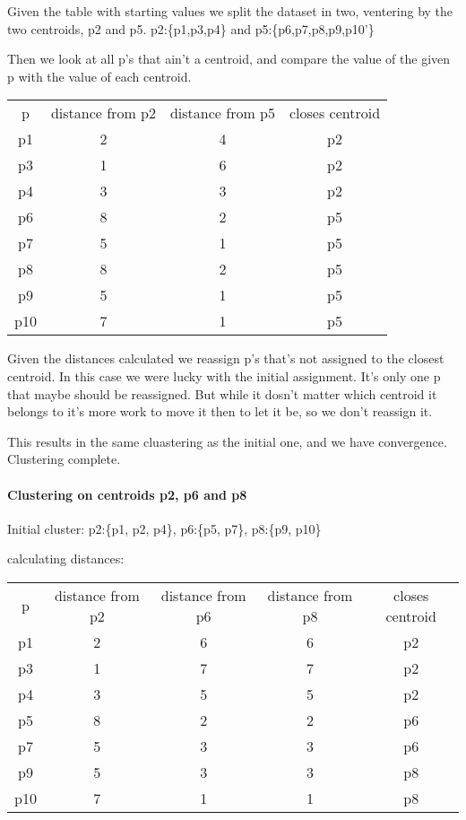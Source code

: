 \documentclass[12pt, a4paper]{article}
\begin{document}
Given the table with starting values we split the dataset in two, ventering by the two centroids, p2 and p5.
p2:\{p1,p3,p4\} and p5:\{p6,p7,p8,p9,p10'\}

Then we look at all p's that ain't a centroid, and compare the value of the given p with the value of each centroid. 

\begin{tabular}{ c c c c }
p & distance from p2 & distance from p5 & closes centroid \\
p1 & 2 & 4 & p2 \\
p3 & 1 & 6 & p2 \\
p4 & 3 & 3 & p2 \\
p6 & 8 & 2 & p5 \\
p7 & 5 & 1 & p5 \\
p8 & 8 & 2 & p5 \\
p9 & 5 & 1 & p5 \\
p10 & 7 & 1 & p5  \\
\end{tabular}

Given the distances calculated we reassign p's that's not assigned to the closest centroid. 
In this case we were lucky with the initial assignment. It's only one p that maybe should be reassigned. 
But while it dosn't matter which centroid it belongs to it's more work to move it then to let it be, so we don't reassign it. 

This results in the same cluastering as the initial one, and we have convergence. Clustering complete. 

\paragraph{Clustering on centroids p2, p6 and p8} 

Initial cluster: p2:\{p1, p2, p4\}, p6:\{p5, p7\}, p8:\{p9, p10\}

calculating distances: 

\begin{tabular}{ c c c c c }
p & distance from p2 & distance from p6 & distance from p8 & closes centroid \\
p1 & 2 & 6 & 6 & p2 \\
p3 & 1 & 7 & 7 & p2 \\
p4 & 3 & 5 & 5 & p2 \\
p5 & 8 & 2 & 2 & p6 \\
p7 & 5 & 3 & 3 & p6 \\
p9 & 5 & 3 & 3 & p8 \\
p10 & 7 & 1 & 1 & p8  \\
\end{tabular}
\end{document}
